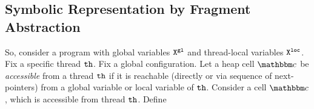 

\subsection{Symbolic Representation by Fragment Abstraction}
So, consider a program with global variables ${\tt X}^{\tt gl}$ and thread-local variables ${\tt X}^{\tt loc}$. Fix a specific thread ${\tt th}$.
Fix a global configuration.
Let a heap cell $\cell$ be {\em accessible} from a thread ${\tt th}$ if
it is reachable (directly or via sequence of
next-pointers) from a global variable or local variable of ${\tt th}$.
Consider a cell $\cell$, which is accessible from thread ${\tt th}$.
Define
